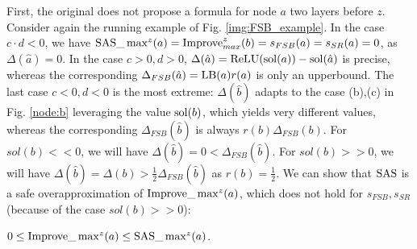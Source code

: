 %	
%	
%	
%	



{\color{red}
 First, the original \cite{DivideAndSlide} does not propose a formula for node $a$ two layers before $z$. 
Consider again the running example of Fig. \ref{img:FSB_example}. 
In the case $c\cdot d<0$, we have $\mathrm{SAS}\_\max\nolimits^z(a)=\mathrm{Improve}_{max}^z(b)=s_{FSB}(a)=s_{SR}(a)=0$, as $\Delta(\hat{a})=0$. In the case $c>0,d>0$, 
$\Delta(\hat{a}) = \mathrm{ReLU}(\mathrm{sol}(a))-\mathrm{sol}(\hat{a})$ is precise,
whereas the corresponding $\Delta_{FSB}(\hat{a}) = \mathrm{LB}(a) r(a)$ is only an upperbound.
The last case $c<0,d<0$ is the most extreme: 
$\Delta(\hat{b})$ adapts to the case (b),(c) in Fig. \ref{node:b} leveraging the value $\mathrm{sol}(b)$, which yields very different values, whereas the corresponding $\Delta_{FSB}(\hat{b})$
is always $r(b) \Delta_{FSB}(b)$. For $sol(b)<<0$, we will have 
$\Delta(\hat{b})=0<\Delta_{FSB}(\hat{b})$.
For $sol(b)>>0$, we will have 
$\Delta(\hat{b})=\Delta(b) > \frac{1}{2}\Delta_{FSB}(\hat{b})$ 
as $r(b)=\frac{1}{2}$. We can show that $\mathrm{SAS}$ is a safe overapproximation of 
$\mathrm{Improve}\_\max^z(a)$, which does not hold for $s_{FSB},s_{SR}$ (because of the case $sol(b)>>0$):
}

\begin{proposition}
	\label{prop2}
		$0 \leq \mathrm{Improve}\_\max^z(a) \leq \mathrm{SAS}\_\max^z(a)$. 
\end{proposition}



